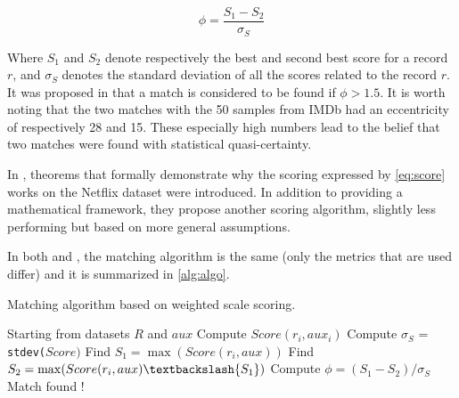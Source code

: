 \begin{equation}
	\phi = \frac{S_1-S_2}{\sigma_S}
\end{equation}

Where $S_1$ and $S_2$ denote respectively the best and second best score for a record $r$, and $\sigma_S$ denotes the standard deviation of all the scores related to the record $r$. It was proposed in \cite{netflix} that a match is considered to be found if $\phi > 1.5$. It is worth noting that the two matches with the 50 samples from IMDb had an eccentricity of respectively 28 and 15. These especially high numbers lead to the belief that two matches were found with statistical quasi-certainty.

In \cite{netflix-analytic}, theorems that formally demonstrate why the scoring expressed by \autoref{eq:score} works on the Netflix dataset were introduced. In addition to providing a mathematical framework, they propose another scoring algorithm, slightly less performing but based on more general assumptions.
 
%
%
%

In both \cite{netflix} and \cite{netflix-analytic}, the matching algorithm is the same (only the metrics that are used differ) and it is summarized in \autoref{alg:algo}.

\begin{algorithm}[h]
	\caption{Matching algorithm based on weighted scale scoring.}
	\label{alg:algo}
	\begin{algorithmic}[1]
		\State Starting from datasets $R$ and $aux$
		\newline
				\State Compute $Score(r_i,aux_i)$
			\EndFor
			\State Compute $\sigma_S$ = \texttt{stdev(}$Score\texttt{)}$
			\State Find $S_1 = \max(Score(r_i, aux))$
			\State Find $S_2 = \max(Score(r_i, aux) \textbackslash \{S_1\})$
			\State Compute $\phi = (S_1-S_2)/\sigma_S$
				\State Match found !
			\EndIf
		\EndFor
	\end{algorithmic}
\end{algorithm}


